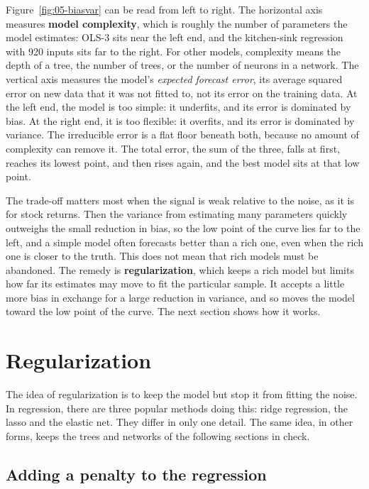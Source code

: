 Figure~\ref{fig:05-biasvar} can be read from left to right. The horizontal axis measures \textbf{model complexity}, which is roughly the number of parameters the model estimates: OLS-3 sits near the left end, and the kitchen-sink regression with 920 inputs sits far to the right. For other models, complexity means the depth of a tree, the number of trees, or the number of neurons in a network. The vertical axis measures the model's \emph{expected forecast error}, its average squared error on new data that it was not fitted to, not its error on the training data. At the left end, the model is too simple: it underfits, and its error is dominated by bias. At the right end, it is too flexible: it overfits, and its error is dominated by variance. The irreducible error is a flat floor beneath both, because no amount of complexity can remove it. The total error, the sum of the three, falls at first, reaches its lowest point, and then rises again, and the best model sits at that low point.

The trade-off matters most when the signal is weak relative to the noise, as it is for stock returns. Then the variance from estimating many parameters quickly outweighs the small reduction in bias, so the low point of the curve lies far to the left, and a simple model often forecasts better than a rich one, even when the rich one is closer to the truth. This does not mean that rich models must be abandoned. The remedy is \textbf{regularization}, which keeps a rich model but limits how far its estimates may move to fit the particular sample. It accepts a little more bias in exchange for a large reduction in variance, and so moves the model toward the low point of the curve. The next section shows how it works.


\section{Regularization}
\label{sec:21-models}
\label{sec:21-shrinkage}

The idea of regularization is to keep the model but stop it from fitting the noise. In regression, there are three popular methods doing this: ridge regression, the lasso and the elastic net. They differ in only one detail. The same idea, in other forms, keeps the trees and networks of the following sections in check.

\subsection{Adding a penalty to the regression}

